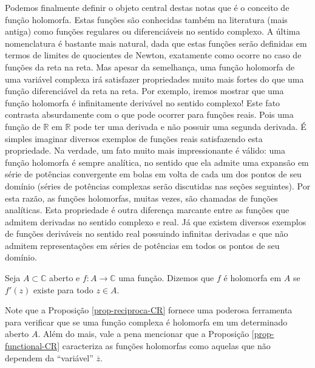 Podemos finalmente definir o objeto central 
destas notas que é o conceito de função holomorfa.
Estas funções são conhecidas também na 
literatura (mais antiga) como funções regulares
ou diferenciáveis no sentido complexo. 
A última nomenclatura é bastante mais natural, 
dada que estas funções serão definidas em termos de limites de quocientes de Newton,
exatamente como ocorre no caso de funções da reta na reta. Mas apesar da semelhança,
uma função holomorfa de uma variável complexa irá satisfazer propriedades muito mais fortes
do que  uma função diferenciável da reta na reta. Por exemplo, iremos mostrar que uma função 
holomorfa é infinitamente derivável no sentido complexo! Este fato contrasta absurdamente
com o que pode ocorrer para funções reais. Pois uma função de $\mathbb{R}$ em $\mathbb{R}$  
pode ter uma derivada e não possuir uma segunda derivada. É simples imaginar diversos 
exemplos de funções reais satisfazendo esta propriedade. Na verdade, um fato muito mais 
impressionante é válido: uma função holomorfa é sempre analítica, no sentido que ela admite 
uma expansão em série de potências convergente em bolas em volta de cada um dos pontos de seu 
domínio (séries de potências complexas serão discutidas nas seções seguintes). Por 
esta razão, as funções holomorfas, muitas vezes, são chamadas de funções analíticas.
Esta propriedade é outra diferença marcante entre as funções que admitem derivadas no sentido complexo e
real. Já que existem diversos exemplos de funções deriváveis no sentido real possuindo 
infinitas derivadas e que não admitem representações em séries de potências em todos os 
pontos de seu domínio.



\begin{definicao}
\label{def-func-holomorfa}
Seja $A\subset\mathbb{C}$ aberto e $f:A\to\mathbb{C}$ uma função. Dizemos que 
$f$ é holomorfa em $A$ se $f'(z)$ existe para todo $z\in A$. 
\end{definicao}

Note que a Proposição \ref{prop-reciproca-CR} fornece uma poderosa ferramenta
para verificar que se uma função complexa é holomorfa em um determinado aberto $A$.
Além do mais, vale a pena mencionar que a Proposição \ref{prop-functional-CR}
caracteriza as funções holomorfas como aquelas que não dependem da ``variável'' $\overline{z}$.

